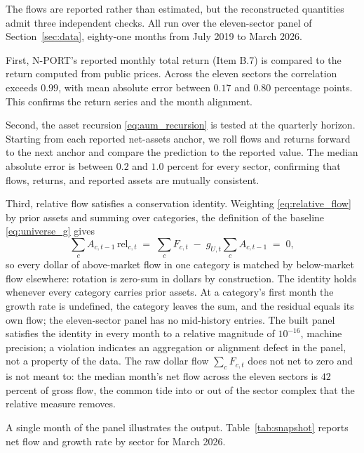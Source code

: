 \documentclass[11pt]{article}
\begin{document}
The flows are reported rather than estimated, but the reconstructed quantities admit three
independent checks. All run over the eleven-sector panel of Section~\ref{sec:data},
eighty-one months from July 2019 to March 2026.

First, N-PORT's reported monthly total return (Item B.7) is compared to the return
computed from public prices. Across the eleven sectors the correlation exceeds $0.99$,
with mean absolute error between $0.17$ and $0.80$ percentage points. This confirms the
return series and the month alignment.

Second, the asset recursion \eqref{eq:aum_recursion} is tested at the quarterly horizon.
Starting from each reported net-assets anchor, we roll flows and returns forward to the
next anchor and compare the prediction to the reported value. The median absolute error is
between $0.2$ and $1.0$ percent for every sector, confirming that flows, returns, and
reported assets are mutually consistent.

Third, relative flow satisfies a conservation identity. Weighting
\eqref{eq:relative_flow} by prior assets and summing over categories, the definition of
the baseline \eqref{eq:universe_g} gives
\begin{equation}
\label{eq:flow_conservation}
\sum_c A_{c,t-1}\,\mathrm{rel}_{c,t}
  \;=\; \sum_c F_{c,t} \;-\; g_{U,t} \sum_c A_{c,t-1} \;=\; 0,
\end{equation}
so every dollar of above-market flow in one category is matched by below-market flow
elsewhere: rotation is zero-sum in dollars by construction. The identity holds whenever
every category carries prior assets. At a category's first month the growth rate is
undefined, the category leaves the sum, and the residual equals its own flow; the
eleven-sector panel has no mid-history entries. The built panel satisfies the identity
in every month to a relative magnitude of $10^{-16}$, machine precision; a violation
indicates an aggregation or alignment defect in the panel, not a property of the data.
The raw dollar flow $\sum_c F_{c,t}$ does not net to zero and is not meant to: the
median month's net flow across the eleven sectors is $42$ percent of gross flow, the
common tide into or out of the sector complex that the relative measure removes.

A single month of the panel illustrates the output. Table~\ref{tab:snapshot} reports net
flow and growth rate by sector for March 2026.
\end{document}
